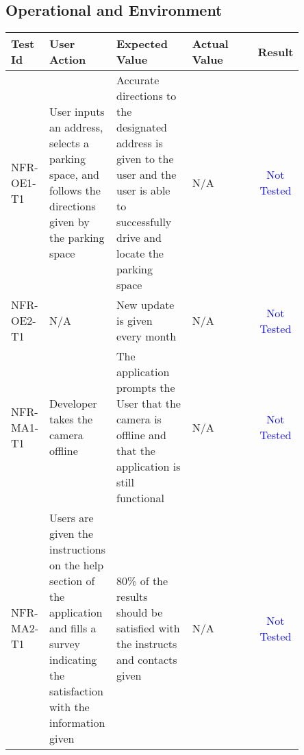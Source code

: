 \documentclass[12pt, titlepage]{article}
\begin{document}
\subsection{Operational and Environment}
\begin{center}
\begin{tabular}{|p{0.10\linewidth}|p{0.15\linewidth}|p{0.30\linewidth}|p{0.30\linewidth}|c|} 
\hline
\textbf{Test Id} & \textbf{User Action} & \textbf{Expected Value} &
\textbf{Actual Value} & \textbf{Result} \\
\hline 
NFR-OE1-T1 & User inputs an address, selects a parking space, and follows the
directions given by the parking space & Accurate directions to the designated
address is given to the user and the user is able to successfully drive and
locate the parking space & N/A & \textcolor{Blue}{Not Tested} \\
\hline 
NFR-OE2-T1 & N/A & New update is given every month & N/A & \textcolor{Blue}{Not
Tested} \\
\hline 
NFR-MA1-T1 & Developer takes the camera offline & The application prompts the
User that the camera is offline and that the application is still functional &
N/A & \textcolor{Blue}{Not Tested}\\
\hline 
NFR-MA2-T1 & Users are given the instructions on the help section of the
application and fills a survey indicating the satisfaction with the information
given & 80\% of the results should be satisfied with the instructs and contacts
given & N/A & \textcolor{Blue}{Not Tested} \\
\hline 
\end{tabular}
\end{center}
\end{document}
